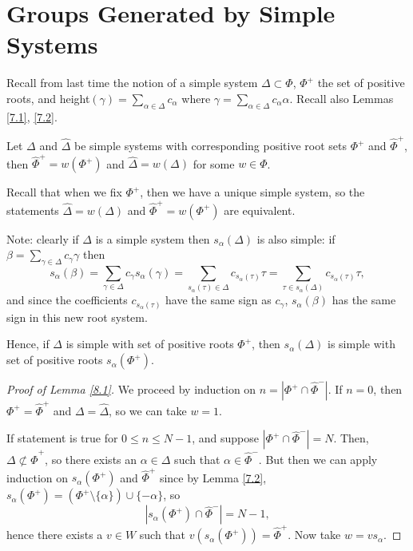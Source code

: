 \section{Groups Generated by Simple Systems}

Recall from last time the notion of a simple system $\Delta \subset \Phi$,
$\Phi^+$ the set of positive roots, and height$(\gamma) = \sum_{\alpha \in \Delta}
c_\alpha$ where $\gamma = \sum_{\alpha \in \Delta} c_\alpha \alpha$. Recall also
Lemmas \ref{7.1}, \ref{7.2}.

\begin{lemma} \label{8.1}
Let $\Delta$ and $\hat{\Delta}$ be simple systems with corresponding positive
root sets $\Phi^+$ and $\hat{\Phi}^+$, then $\hat{\Phi}^+ = w(\Phi^+)$ and
$\hat{\Delta} = w(\Delta)$ for some $w \in \Phi$.
\end{lemma}

Recall that when we fix $\Phi^+$, then we have a unique simple system, so the
statements $\hat{\Delta} = w(\Delta)$ and $\hat{\Phi}^+ = w(\Phi^+)$ are
equivalent.

Note: clearly if $\Delta$ is a simple system then $s_\alpha(\Delta)$ is also
simple: if $\beta = \sum_{\gamma \in \Delta} c_\gamma \gamma$ then
\[
    s_\alpha(\beta) = \sum_{\gamma \in \Delta} c_\gamma s_\alpha(\gamma)
    = \sum_{s_\alpha(\tau) \in \Delta} c_{s_\alpha(\tau)} \tau
    = \sum_{\tau \in s_\alpha(\Delta)} c_{s_\alpha(\tau)} \tau,
\]
and since the coefficients $c_{s_\alpha(\tau)}$ have the same sign as $c_\gamma$,
$s_\alpha(\beta)$ has the same sign in this new root system.

Hence, if $\Delta$ is simple with set of positive roots $\Phi^+$, then
$s_\alpha(\Delta)$ is simple with set of positive roots $s_\alpha(\Phi^+)$.

\begin{proof}[Proof of Lemma \ref{8.1}]
We proceed by induction on $n = |\Phi^+ \cap \hat{\Phi}^-|$.
If $n = 0$, then $\Phi^+ = \hat{\Phi}^+$ and $\Delta = \hat{\Delta}$, so we can
take $w = 1$.

If statement is true for $0 \leq n \leq N-1$, and suppose
$|\Phi^+ \cap \hat{\Phi}^-| = N$. Then, $\Delta \not\subset \hat{\Phi}^+$, so
there exists an $\alpha \in \Delta$ such that $\alpha \in \hat{\Phi}^-$. But
then we can apply induction on $s_\alpha(\Phi^+)$ and $\hat{\Phi}^+$ since by
Lemma \ref{7.2}, $s_\alpha(\Phi^+) = (\Phi^+ \setminus \{\alpha\}) \cup \{-\alpha\}$,
so
\[
    \left| s_\alpha(\Phi^+) \cap \hat{\Phi}^- \right| = N-1,
\]
hence there exists a $v \in W$ such that
$v(s_\alpha(\Phi^+)) = \hat{\Phi}^+$.
Now take $w = vs_\alpha$.
\end{proof}

